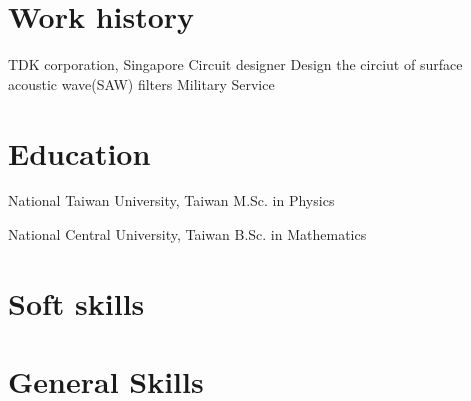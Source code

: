 \documentclass[%
               doublesided,
               paper=a4,
               fontsize=10pt
              ]{resume}
\begin{document}
{    \section[\faGears]{Work history}
        {TDK corporation, Singapore}
        {Circuit designer}
        {Design the circiut of surface acoustic wave(SAW) filters}
        {Military Service}
        {}

    \section[\faMortarBoard]{Education}
        {National Taiwan University, Taiwan}
        {M.Sc. in Physics}

        {National Central University, Taiwan}
        {B.Sc. in Mathematics}


    \section{Soft skills}

    \section{General Skills}



}
\makebody
\clearpage
\end{document}
